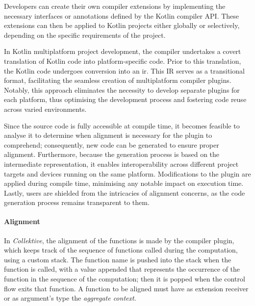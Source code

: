 Developers can create their own compiler extensions by implementing the necessary interfaces or annotations defined by
the Kotlin compiler API.
These extensions can then be applied to Kotlin projects either globally or selectively, depending on the specific
requirements of the project.

In Kotlin multiplatform project development, the compiler undertakes a covert translation of Kotlin code into platform-specific code.
Prior to this translation, the Kotlin code undergoes conversion into an \ac{ir}.
This IR serves as a transitional format, facilitating the seamless creation of multiplatform compiler plugins.
Notably, this approach eliminates the necessity to develop separate plugins for each platform, thus optimising the
development process and fostering code reuse across varied environments.

Since the source code is fully accessible at compile time, it becomes feasible to analyse it to determine when alignment
is necessary for the plugin to comprehend; consequently, new code can be generated to ensure proper alignment.
Furthermore, because the generation process is based on the intermediate representation, it enables interoperability across
different project targets and devices running on the same platform.
Modifications to the plugin are applied during compile time, minimising any notable impact on execution time.
Lastly, users are shielded from the intricacies of alignment concerns, as the code generation process remains transparent to them.


\paragraph{Alignment}


In \emph{Collektive}, the alignment of the functions is made by the compiler plugin, which keeps track of the sequence of
functions called during the computation, using a custom stack.
The function name is pushed into the stack when the function is called, with a value appended that represents the occurrence of the
function in the sequence of the computation; then it is popped when the control flow exits that function.
A function to be aligned must have as extension receiver or as argument's type the \emph{aggregate context}.

